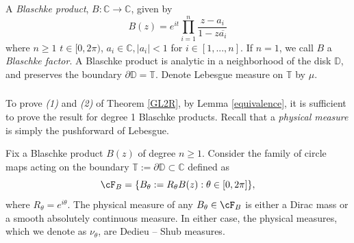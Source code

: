 \documentclass[10pt]{amsart}
\numberwithin{equation}{section}     %
\newcommand{\C}{\mathbb{C}}
\newcommand{\T}{\mathbb{T}}
\begin{document}
\subsubsection{}
A \emph{Blaschke product}, $B:\C \to \C$, given by $$B(z) = e^{it}  \prod \limits_{i=1}^n \frac{z - a_i}{1- z \overline{a_i}}$$ where $n \geq 1$ $t \in [0,2\pi)$, $a_i \in \mathbb{C}, |a_i| < 1$ for $i \in [1,...,n]$. If $n = 1$, we call $B$ a \emph{Blaschke factor}. A Blaschke product is analytic in a neighborhood of the disk $\mathbb{D}$, and preserves the boundary $\partial \mathbb{D} = \mathbb{T}$. Denote Lebesgue measure on $\T$ by $\mu$. 

\subsubsection{}
To prove \textit{(1)} and   \textit{(2)} of Theorem \ref{GL2R}, by Lemma \ref{equivalence}, it is sufficient to prove the result for degree 1 Blaschke products. Recall that a \emph{physical measure} is simply the pushforward of Lebesgue. 

\begin{theorem} \label{Blaschke}
    Fix a Blaschke product $B(z)$ of degree $n \geq 1$. Consider the family of circle maps acting on the boundary $\T :=  \partial \mathbb{D} \subset \C$ defined as $$\cF_B = \{B_\theta := R_\theta B(z): \theta \in [0,2\pi] \},$$ where $R_\theta = e^{i\theta}$. The physical measure of any $B_\theta \in \cF_B$ is either a Dirac mass or a smooth absolutely continuous measure. In either case, the physical measures, which we denote as $\nu_\theta$, are Dedieu -- Shub measures. 
\end{theorem}
\end{document}
